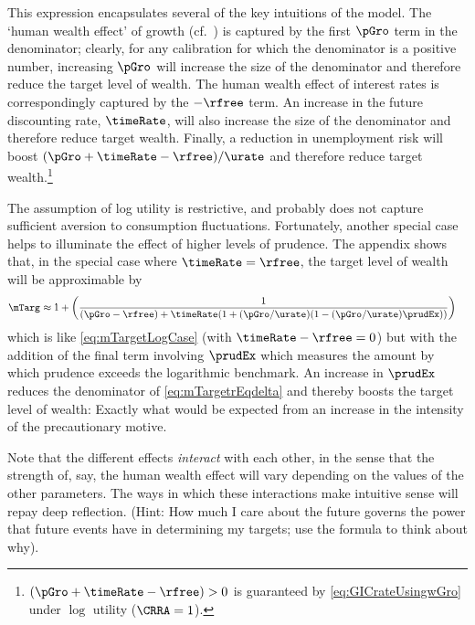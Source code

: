 \documentclass{\handout}
\begin{document}
This expression encapsulates several of the key intuitions of the model.  The
`human wealth effect' of growth (cf.\ \cite{summersCapTax}) is captured by the first $\pGro$ term in the denominator;
clearly, for any calibration for which the denominator is a positive number, increasing
$\pGro$ will increase the size of the denominator and therefore reduce the target
level of wealth.  The human wealth effect of interest rates is  correspondingly captured
by the $-\rfree$ term.  An increase in the future discounting rate, $\timeRate$, will also
increase the size of the denominator and therefore reduce target wealth.  Finally,
a reduction in unemployment risk will boost $(\pGro+\timeRate-\rfree)/\urate$ and therefore reduce target
wealth.\footnote{$(\pGro+\timeRate-\rfree) > 0$ is guaranteed by \eqref{eq:GICrateUsingwGro} under $\log$ utility ($\CRRA=1$).}

The assumption of log utility is restrictive, and probably does not capture sufficient aversion to consumption fluctuations.  Fortunately, another special case helps to illuminate the effect of higher levels of prudence.  The appendix shows that, in the special case where $\timeRate=\rfree$, the target level of wealth will be approximable by
\begin{equation}\begin{gathered}\begin{aligned}
 \mTarg^{\null} & \approx  1 + \left(\frac{1}{(\pGro-\rfree)+\timeRate(1+(\pGro/\urate)(1-(\pGro/\urate)\prudEx))}\right) \label{eq:mTargetrEqdelta}
\end{aligned}\end{gathered}\end{equation}
which is like \eqref{eq:mTargetLogCase} (with $\timeRate-\rfree=0$) but with the addition of the final term involving $\prudEx$ which measures the amount by which prudence exceeds the logarithmic benchmark.  An increase in $\prudEx$ reduces the denominator of \eqref{eq:mTargetrEqdelta} and thereby boosts the target level of wealth: Exactly what would be expected from an increase in the intensity of the precautionary motive.

Note that the different effects {\it interact} with each other, in the sense that the strength of, say, the human wealth effect will vary depending on the values of the other parameters.  The ways in which these interactions make intuitive sense will repay deep reflection.  (Hint: How much I care about the future governs the power that future events have in determining my targets; use the formula to think about why).
\end{document}
